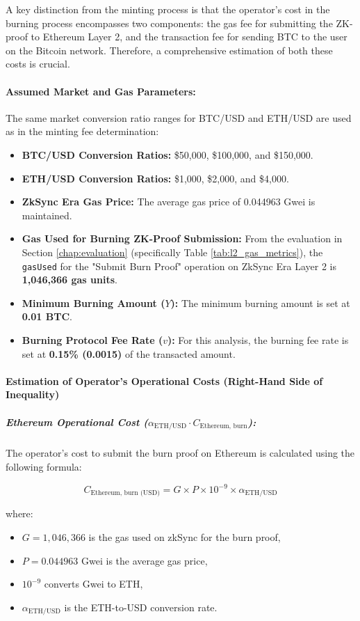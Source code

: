 \documentclass{DESSThesis}
\begin{document}
A key distinction from the minting process is that the operator's cost in the burning process encompasses two components: the gas fee for submitting the ZK-proof to Ethereum Layer 2, and the transaction fee for sending BTC to the user on the Bitcoin network. Therefore, a comprehensive estimation of both these costs is crucial.

\paragraph{Assumed Market and Gas Parameters:}
The same market conversion ratio ranges for BTC/USD and ETH/USD are used as in the minting fee determination:
\begin{itemize}
    \item \textbf{BTC/USD Conversion Ratios:} \$50,000, \$100,000, and \$150,000.
    \item \textbf{ETH/USD Conversion Ratios:} \$1,000, \$2,000, and \$4,000.
    \item \textbf{ZkSync Era Gas Price:} The average gas price of 0.044963 Gwei is maintained.
    \item \textbf{Gas Used for Burning ZK-Proof Submission:} From the evaluation in Section \ref{chap:evaluation} (specifically Table \ref{tab:l2_gas_metrics}), the \texttt{gasUsed} for the "Submit Burn Proof" operation on ZkSync Era Layer 2 is \textbf{1,046,366 gas units}.
    \item \textbf{Minimum Burning Amount (\(Y\)):} The minimum burning amount is set at \textbf{0.01 BTC}.
    \item \textbf{Burning Protocol Fee Rate (\(v\)):} For this analysis, the burning fee rate is set at \textbf{0.15\% (0.0015)} of the transacted amount.
\end{itemize}

\paragraph{Estimation of Operator's Operational Costs (Right-Hand Side of Inequality)}

\subparagraph{Ethereum Operational Cost (\(\alpha_{\text{ETH/USD}} \cdot C_{\text{Ethereum, burn}}\)):}
The operator’s cost to submit the burn proof on Ethereum is calculated using the following formula:

\[
C_{\text{Ethereum, burn (USD)}} = G \times P \times 10^{-9} \times \alpha_{\text{ETH/USD}}
\]

where:
\begin{itemize}
    \item \(G = 1,\!046,\!366\) is the gas used on zkSync for the burn proof,
    \item \(P = 0.044963\) Gwei is the average gas price,
    \item \(10^{-9}\) converts Gwei to ETH,
    \item \(\alpha_{\text{ETH/USD}}\) is the ETH-to-USD conversion rate.
\end{itemize}
\end{document}
